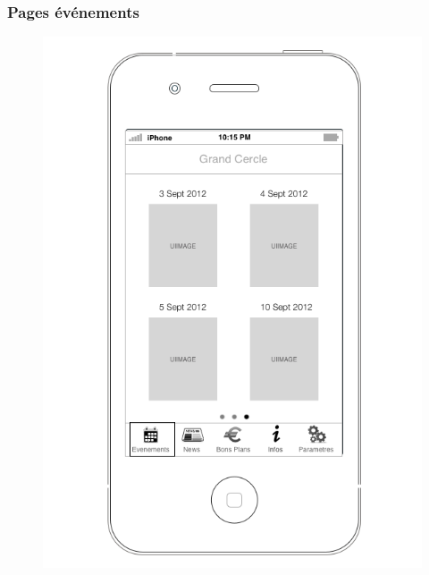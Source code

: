 \documentclass[a4paper, 11px]{article}
\begin{document}
\subsubsection{Pages événements}
\vfill
\begin{figure}[htbp]
	\begin{minipage}[c]{.50\linewidth}
		\begin{center}
			\includegraphics[scale=0.3]{../../Sketch/iOS/evenements_4_prochains.png}
		\end{center}
	\end{minipage}
	\hfill
	\begin{minipage}[c]{.50\linewidth}
		\begin{center}

\end{center}
\end{minipage}
\end{figure}
\end{document}
